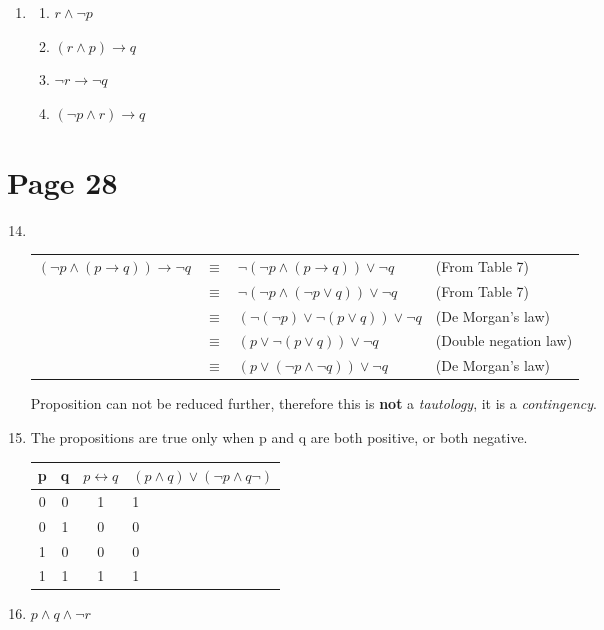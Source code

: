 \documentclass[11pt,a4paper,oneside]{article}
\begin{document}
\begin{enumerate}
\begin{center}
\begin{tabular}{c | c | c | c | l}
\end{tabular}
\end{center}

\setcounter{enumi}{47}
\item %
\begin{enumerate}
\item \( r \wedge \neg p \)
\item \( (r \wedge p ) \rightarrow q \)
\item \( \neg r \rightarrow \neg q \)
\item \( ( \neg p \wedge r ) \rightarrow q \)
\end{enumerate}

\end{enumerate}

\section*{Page 28}
\begin{enumerate}

\setcounter{enumi}{13}
\item \hfill \\ %
\begin{tabular}{r c l l}
  \( ( \neg p \wedge (p \rightarrow q)) \rightarrow \neg q \) & \( \equiv \) & \( \neg( \neg p \wedge (p \rightarrow q) ) \vee \neg q \) & (From Table 7) \\
  & \( \equiv \) & \( \neg( \neg p \wedge ( \neg p \vee q) ) \vee \neg q \) & (From Table 7) \\
  & \( \equiv \) & \( (\neg (\neg p) \vee \neg(p \vee q)) \vee \neg q \) & (De Morgan's law) \\
  & \( \equiv \) & \( (p \vee \neg(p \vee q)) \vee \neg q \) & (Double negation law) \\
  & \( \equiv \) & \( (p \vee (\neg p \wedge \neg q)) \vee \neg q \) & (De Morgan's law) \\
\end{tabular}

Proposition can not be reduced further, therefore this is \textbf{not} a \textit{tautology}, it is a \textit{contingency}.

\setcounter{enumi}{15}
\item The propositions are true only when p and q are both positive, or both negative.

\begin{center}
\begin{tabular}{ c | c | c | l }
  p & q & \( p \leftrightarrow q \) & \( (p \wedge q) \vee (\neg p \wedge q \neg) \) \\
  \hline
  0 & 0 & 1 & 1 \\
  0 & 1 & 0 & 0 \\
  1 & 0 & 0 & 0 \\
  1 & 1 & 1 & 1 \\

\end{tabular}
\end{center}

\setcounter{enumi}{39}
\item %
\( p \wedge q \wedge \neg r \)

\end{enumerate}
\end{document}
